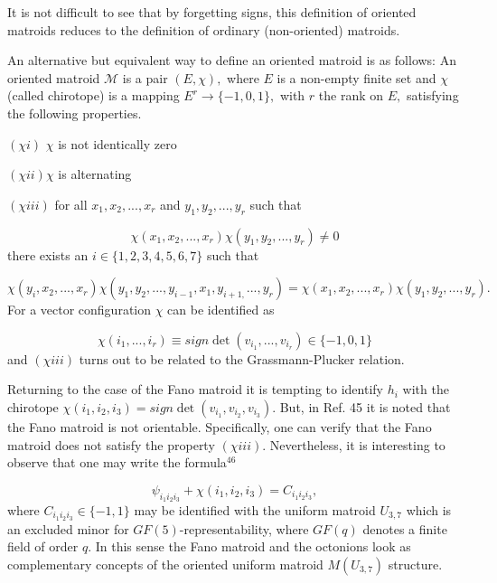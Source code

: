 \documentclass[a4paper,12pt]{article}
\begin{document}
It is not difficult to see that by forgetting signs, this definition of
oriented matroids reduces to the definition of ordinary (non-oriented)
matroids.

An alternative but equivalent way to define an oriented matroid is as
follows: An oriented matroid $\mathcal{M}$ is a pair $(E,\chi ),$ where $E$
is a non-empty finite set and $\chi $ (called chirotope) is a mapping $%
E^{r}\rightarrow \{-1,0,1\},$ with $r$ the rank on $E,$ satisfying the
following properties.

$(\chi i)$ $\chi $ is not identically zero

$(\chi ii)\chi $ is alternating

$(\chi iii)$ for all $x_{1},x_{2},...,x_{r}$ and $y_{1},y_{2},...,y_{r}$
such that

\[
\chi (x_{1},x_{2},...,x_{r})\chi (y_{1},y_{2},...,y_{r})\neq 0 
\]
there exists an $i\in \{1,2,3,4,5,6,7\}$ such that

\[
\chi (y_{i},x_{2},...,x_{r})\chi
(y_{1},y_{2},...,y_{i-1},x_{1},y_{i+1,}...,y_{r})=\chi
(x_{1},x_{2},...,x_{r})\chi (y_{1},y_{2},...,y_{r}). 
\]
For a vector configuration $\chi $ can be identified as

\[
\chi (i_{1},...,i_{r})\equiv sign\det (v_{i_{1}},...,v_{i_{r}})\in
\{-1,0,1\} 
\]
and $(\chi iii)$ turns out to be related to the Grassmann-Plucker relation.

Returning to the case of the Fano matroid it is tempting to identify $h_{i}$
with the chirotope $\chi (i_{1},i_{2},i_{3})=sign\det
(v_{i_{1}},v_{i_{2}},v_{i_{3}})$. But, in Ref. 45 it is noted that the Fano
matroid is not orientable. Specifically, one can verify that the Fano
matroid does not satisfy the property $(\chi iii)$. Nevertheless, it is
interesting to observe that one may write the formula$^{46}$

\[
\psi _{i_{1}i_{2}i_{3}}+\chi (i_{1},i_{2},i_{3})=C_{i_{1}i_{2}i_{3}}, 
\]
where $C_{i_{1}i_{2}i_{3}}\in \{-1,1\}$ may be identified with the uniform
matroid $U_{3,7}$ which is an excluded minor for $GF(5)$-representability,
where $GF(q)$ denotes a finite field of order $q.$ In this sense the Fano
matroid and the octonions look as complementary concepts of the oriented
uniform matroid $M(U_{3,7})$ structure.
\end{document}
